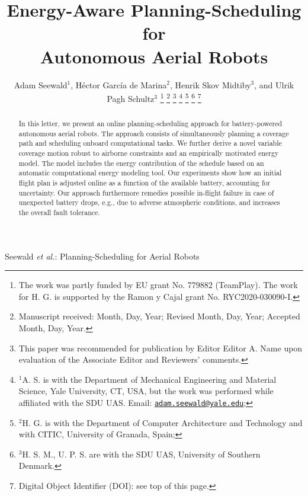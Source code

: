 \documentclass[letterpaper,10pt,journal,twoside]{IEEEtran}
\theoremstyle{definition}
\begin{document}

\title{Energy-Aware Planning-Scheduling for\\Autonomous Aerial Robots}

\author{
  Adam Seewald$^{\text{1}}$, H\'ector Garc\'ia de Marina$^{\text{2}}$, Henrik Skov Midtiby$^{\text{3}}$, and Ulrik Pagh Schultz$^{\text{3}}$
  \thanks{The work was partly funded by EU grant No. 779882 (TeamPlay). The work for H. G. is supported by the Ramon y Cajal grant No. RYC2020-030090-I.}
  \thanks{Manuscript received: Month, Day, Year; Revised Month, Day, Year; Accepted Month, Day, Year.}%
  \thanks{This paper was recommended for publication by Editor Editor A. Name upon evaluation of the Associate Editor and Reviewers' comments.} %
  \thanks{$^{\text{1}}$A. S. is with the Department of Mechanical Engineering and Material Science, Yale University, CT, USA, but the work was performed while affiliated with the SDU UAS. Email: {\tt\footnotesize \href{mailto:adam.seewald@yale.edu}{adam.seewald@yale.edu}};}
  \thanks{$^{\text{2}}$H. G. is with the Department of Computer Architecture and Technology and with CITIC, University of Granada, Spain;} 
  \thanks{$^{\text{3}}$H. S. M.,  U. P. S. are with the SDU UAS, %
  University of Southern Denmark.}
  \thanks{Digital Object Identifier (DOI): see top of this page.}
}

{Seewald \MakeLowercase{\textit{et al.}}: Planning-Scheduling for Aerial Robots} 

\maketitle
 
\vspace*{-5ex}

\begin{abstract}
  In this letter, we present an online planning-scheduling approach for battery-powered autonomous aerial robots. The approach consists of simultaneously planning a coverage path and scheduling onboard computational tasks. We further derive a novel variable coverage motion robust to airborne constraints and an empirically motivated energy model. The model includes the energy contribution of the schedule based on an automatic computational energy modeling tool. Our experiments show how an initial flight plan is adjusted online as a function of the available battery, accounting for uncertainty. Our approach furthermore remedies possible in-flight failure in case of unexpected battery drops, e.g., due to adverse atmospheric conditions, and increases the overall fault tolerance.
\end{abstract}
\end{document}
